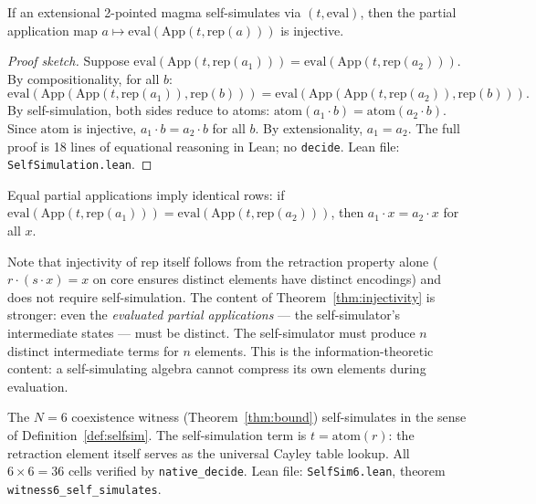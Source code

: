 \documentclass[sigconf,screen,review,anonymous]{acmart}
\newcommand{\dotop}{\cdot}
\theoremstyle{remark}
\begin{document}
\begin{theorem}
\label{thm:injectivity}
If an extensional 2-pointed magma self-simulates via $(t, \text{eval})$, then the partial application map $a \mapsto \text{eval}(\text{App}(t, \text{rep}(a)))$ is injective.
\end{theorem}

\begin{proof}[Proof sketch]
Suppose $\text{eval}(\text{App}(t, \text{rep}(a_1))) = \text{eval}(\text{App}(t, \text{rep}(a_2)))$. By compositionality, for all $b$:
\[
\text{eval}(\text{App}(\text{App}(t, \text{rep}(a_1)), \text{rep}(b))) = \text{eval}(\text{App}(\text{App}(t, \text{rep}(a_2)), \text{rep}(b))).
\]
By self-simulation, both sides reduce to atoms: $\text{atom}(a_1 \dotop b) = \text{atom}(a_2 \dotop b)$. Since $\text{atom}$ is injective, $a_1 \dotop b = a_2 \dotop b$ for all $b$. By extensionality, $a_1 = a_2$. The full proof is 18 lines of equational reasoning in Lean; no \texttt{decide}. Lean file: \texttt{SelfSimulation.lean}.
\end{proof}

\begin{corollary}[Discrimination]
\label{cor:discrimination}
Equal partial applications imply identical rows: if $\text{eval}(\text{App}(t, \text{rep}(a_1))) = \text{eval}(\text{App}(t, \text{rep}(a_2)))$, then $a_1 \dotop x = a_2 \dotop x$ for all $x$.
\end{corollary}

Note that injectivity of $\text{rep}$ itself follows from the retraction property alone ($r \dotop (s \dotop x) = x$ on core ensures distinct elements have distinct encodings) and does not require self-simulation. The content of Theorem~\ref{thm:injectivity} is stronger: even the \emph{evaluated partial applications} --- the self-simulator's intermediate states --- must be distinct. The self-simulator must produce $n$ distinct intermediate terms for $n$ elements. This is the information-theoretic content: a self-simulating algebra cannot compress its own elements during evaluation.

\begin{theorem}[Self-Simulation at $N\!=\!6$]
\label{thm:selfsim6}
The $N\!=\!6$ coexistence witness (Theorem~\ref{thm:bound}) self-simulates in the sense of Definition~\ref{def:selfsim}. The self-simulation term is $t = \text{atom}(r)$: the retraction element itself serves as the universal Cayley table lookup. All $6 \times 6 = 36$ cells verified by \texttt{native\_decide}. Lean file: \texttt{SelfSim6.lean}, theorem \texttt{witness6\_self\_simulates}.
\end{theorem}
\end{document}
